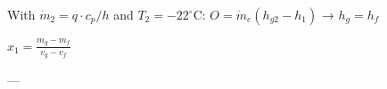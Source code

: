 With \( \dot{m}_2 = q \cdot c_{p} / h \) and \( T_2 = -22^\circ \text{C} \):  
\( O = \dot{m}_e (h_{g2} - h_1) \) → \( h_{g} = h_f \)  

\( x_1 = \frac{m_g - m_f}{v_g - v_f} \)  

---